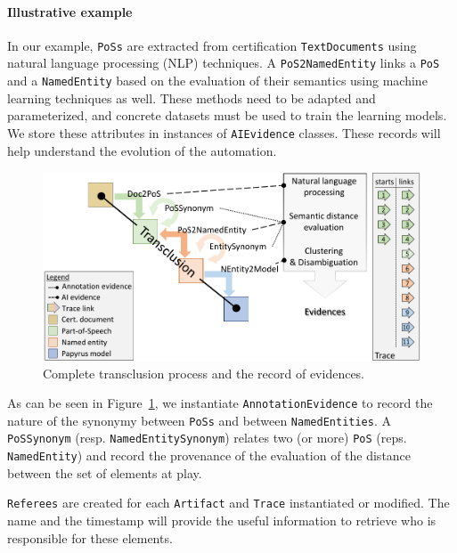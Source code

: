 \paragraph{Illustrative example}
In our example, \texttt{PoSs} are extracted from certification \texttt{TextDocuments} using natural language processing (NLP) techniques. A \texttt{PoS2NamedEntity} links a \texttt{PoS} and a \texttt{NamedEntity} based on the evaluation of their semantics using machine learning techniques as well. These methods need to be adapted and parameterized, and concrete datasets must be used to train the learning models. We store these attributes in instances of \texttt{AIEvidence} classes. These records will help understand the evolution of the automation.
\begin{figure}[h]
	\centering
	\includegraphics[width=.85\linewidth]{images/relationtyping-re}
	\caption{Complete transclusion process and the record of evidences.}
	\label{fig:mm-relationtyping-re}
\end{figure}
As can be seen in Figure~\ref{fig:mm-relationtyping-re}, we instantiate \texttt{AnnotationEvidence} to record the nature of the synonymy between \texttt{PoSs} and between \texttt{NamedEntities}. 
A \texttt{PoSSynonym} (resp. \texttt{NamedEntitySynonym}) relates two (or more) \texttt{PoS} (reps. \texttt{NamedEntity}) and record the provenance of the evaluation of the distance between the set of elements at play. 

\texttt{Referees} are created for each \texttt{Artifact} and \texttt{Trace} instantiated or modified. The name and the timestamp will provide the useful information to retrieve who is responsible for these elements.



